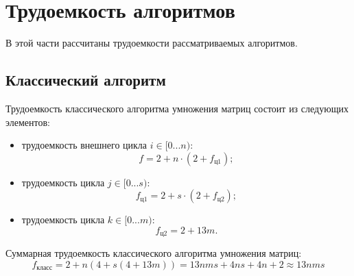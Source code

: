 \clearpage
\section{Трудоемкость алгоритмов}
В этой части рассчитаны трудоемкости рассматриваемых алгоритмов.

\subsection{Классический алгоритм}
Трудоемкость классического алгоритма умножения матриц состоит из следующих элементов:
\begin{itemize}
	\item трудоемкость внешнего цикла $i \in [0...n)$:
		\begin{equation}
			f = 2 + n \cdot (2 + f_{\text{ц1}});
		\end{equation}
	\item трудоемкость цикла $j \in [0...s)$:
		\begin{equation}
			f_{\text{ц1}} = 2 + s \cdot (2 + f_{\text{ц2}});
		\end{equation}
	\item трудоемкость цикла $k \in [0...m)$:
	\begin{equation}
		f_{\text{ц2}} = 2 + 13m.
	\end{equation}
\end{itemize}

Суммарная трудоемкость классического алгоритма умножения матриц:
\begin{equation}
	f_{\text{класс}} = 2 + n(4 + s(4 + 13m)) = 13nms + 4ns + 4n + 2 \approx 13nms 
\end{equation}


